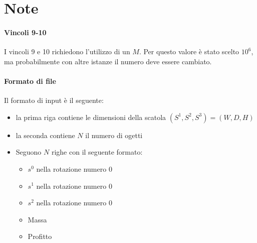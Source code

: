 \documentclass{scrartcl}
\begin{document}
\section{Note}

\paragraph{Vincoli 9-10} I vincoli 9 e 10 richiedono l'utilizzo di un $M$. Per questo
valore è stato scelto $10^6$, ma probabilmente con altre istanze il numero deve essere cambiato.


\paragraph{Formato di file}
Il formato di input è il seguente:
\begin{itemize}
	\item la prima riga contiene le dimensioni della scatola $(S^1, S^2, S^3) = (W, D, H)$
	\item la seconda contiene $N$ il numero di ogetti
	\item Seguono $N$ righe con il seguente formato:
	\begin{itemize}
		\item $s^0$ nella rotazione numero $0$
		\item $s^1$ nella rotazione numero $0$
		\item $s^2$ nella rotazione numero $0$
		\item Massa
		\item Profitto
	\end{itemize}
\end{itemize}
\end{document}
